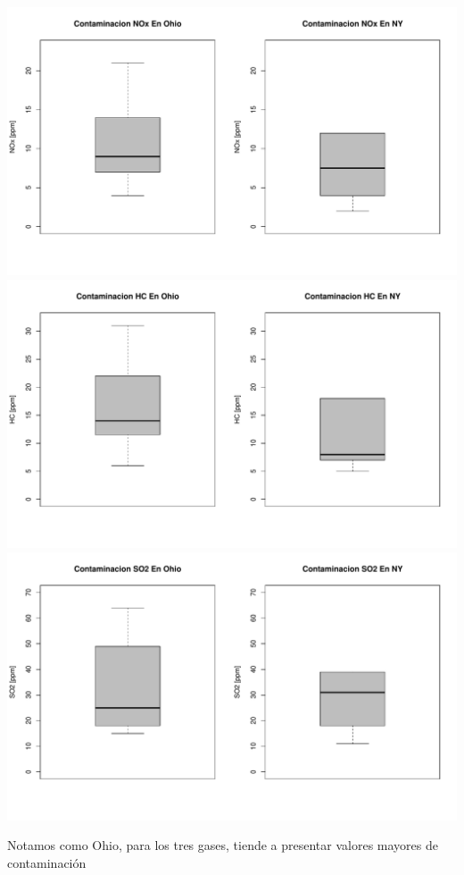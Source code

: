 \documentclass[11pt]{article}
\begin{document}
\begin{center}
    \includegraphics[scale = 0.4]{ohnynox}
    \includegraphics[scale = 0.4]{ohnyhc}
    \includegraphics[scale = 0.4]{ohnyso2}
\end{center}

Notamos como Ohio, para los tres gases, tiende a presentar valores mayores de contaminación
\end{document}
